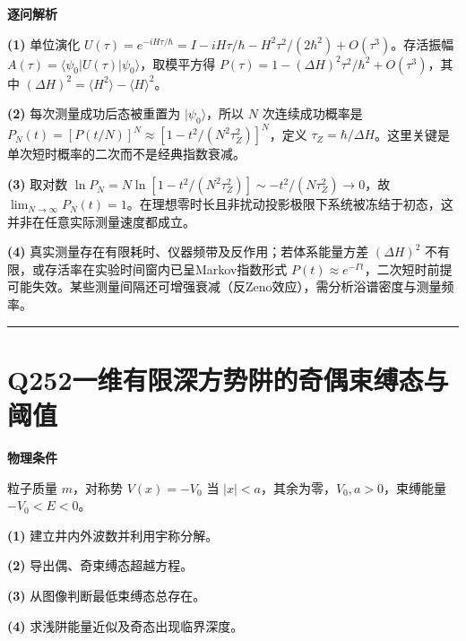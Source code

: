 \documentclass[UTF8,a4paper,11pt,oneside,openany]{ctexbook}
\begin{document}
\par\medskip\noindent\textbf{逐问解析}
\par\noindent\textbf{(1)} 单位演化 \(U(\tau)=e^{-iH\tau/\hbar}=I-iH\tau/\hbar-H^2\tau^2/(2\hbar^2)+O(\tau^3)\)。存活振幅 \(A(\tau)=\langle\psi_0|U(\tau)|\psi_0\rangle\)，取模平方得 \(P(\tau)=1-(\Delta H)^2\tau^2/\hbar^2+O(\tau^3)\)，其中 \((\Delta H)^2=\langle H^2\rangle-\langle H\rangle^2\)。
\par\noindent\textbf{(2)} 每次测量成功后态被重置为 \(|\psi_0\rangle\)，所以 \(N\) 次连续成功概率是 \(P_N(t)=[P(t/N)]^N\approx[1-t^2/(N^2\tau_Z^2)]^N\)，定义 \(\tau_Z=\hbar/\Delta H\)。这里关键是单次短时概率的二次而不是经典指数衰减。
\par\noindent\textbf{(3)} 取对数 \(\ln P_N=N\ln[1-t^2/(N^2\tau_Z^2)]\sim-t^2/(N\tau_Z^2)\to0\)，故 \(\lim_{N\to\infty}P_N(t)=1\)。在理想零时长且非扰动投影极限下系统被冻结于初态，这并非在任意实际测量速度都成立。
\par\noindent\textbf{(4)} 真实测量存在有限耗时、仪器频带及反作用；若体系能量方差 \((\Delta H)^2\) 不有限，或存活率在实验时间窗内已呈Markov指数形式 \(P(t)\approx e^{-\Gamma t}\)，二次短时前提可能失效。某些测量间隔还可增强衰减（反Zeno效应），需分析浴谱密度与测量频率。

\par\bigskip\hrule\bigskip
\section*{Q252\quad 一维有限深方势阱的奇偶束缚态与阈值}
\textbf{物理条件}\par 粒子质量 \(m\)，对称势 \(V(x)=-V_0\) 当 \(|x|<a\)，其余为零，\(V_0,a>0\)，束缚能量 \(-V_0<E<0\)。
\par\noindent\textbf{(1)} 建立井内外波数并利用宇称分解。
\par\noindent\textbf{(2)} 导出偶、奇束缚态超越方程。
\par\noindent\textbf{(3)} 从图像判断最低束缚态总存在。
\par\noindent\textbf{(4)} 求浅阱能量近似及奇态出现临界深度。
\end{document}

